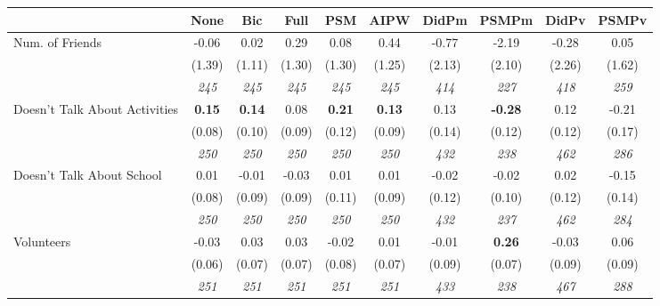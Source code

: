 \begin{tabular}{l c c c c c c c c c}
\toprule
 & None & Bic & Full & PSM & AIPW & DidPm & PSMPm & DidPv & PSMPv \\
\midrule
Num. of Friends & -0.06 & 0.02 & 0.29 & 0.08 & 0.44 & -0.77 & -2.19 & -0.28 & 0.05 \\
& (1.39) & (1.11) & (1.30) & (1.30) & (1.25) & (2.13) & (2.10) & (2.26) & (1.62) \\
& \textit{ 245 } & \textit{ 245 } & \textit{ 245 } & \textit{ 245 } & \textit{ 245 } & \textit{ 414 } & \textit{ 227 } & \textit{ 418 } & \textit{ 259 } \\
Doesn't Talk About Activities & \textbf{ 0.15 } & \textbf{ 0.14 } & 0.08 & \textbf{0.21} & \textbf{0.13} & 0.13 & \textbf{-0.28} & 0.12 & -0.21 \\
& (0.08) & (0.10) & (0.09) & (0.12) & (0.09) & (0.14) & (0.12) & (0.12) & (0.17) \\
& \textit{ 250 } & \textit{ 250 } & \textit{ 250 } & \textit{ 250 } & \textit{ 250 } & \textit{ 432 } & \textit{ 238 } & \textit{ 462 } & \textit{ 286 } \\
Doesn't Talk About School & 0.01 & -0.01 & -0.03 & 0.01 & 0.01 & -0.02 & -0.02 & 0.02 & -0.15 \\
& (0.08) & (0.09) & (0.09) & (0.11) & (0.09) & (0.12) & (0.10) & (0.12) & (0.14) \\
& \textit{ 250 } & \textit{ 250 } & \textit{ 250 } & \textit{ 250 } & \textit{ 250 } & \textit{ 432 } & \textit{ 237 } & \textit{ 462 } & \textit{ 284 } \\
Volunteers & -0.03 & 0.03 & 0.03 & -0.02 & 0.01 & -0.01 & \textbf{0.26} & -0.03 & 0.06 \\
& (0.06) & (0.07) & (0.07) & (0.08) & (0.07) & (0.09) & (0.07) & (0.09) & (0.09) \\
& \textit{ 251 } & \textit{ 251 } & \textit{ 251 } & \textit{ 251 } & \textit{ 251 } & \textit{ 433 } & \textit{ 238 } & \textit{ 467 } & \textit{ 288 } \\
\bottomrule
\end{tabular}
